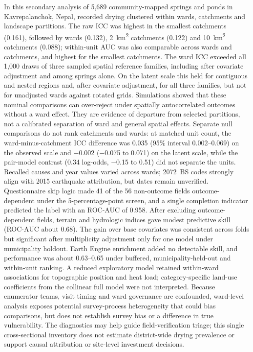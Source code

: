 \documentclass[preprint,12pt,authoryear]{elsarticle}
\begin{document}
In this secondary analysis of 5,689 community-mapped springs and ponds in Kavrepalanchok, Nepal, recorded drying clustered within wards, catchments and landscape partitions. The raw ICC was highest in the smallest catchments (0.161), followed by wards (0.132), \SI{2}{\kilo\metre\squared} catchments (0.122) and \SI{10}{\kilo\metre\squared} catchments (0.088); within-unit AUC was also comparable across wards and catchments, and highest for the smallest catchments. The ward ICC exceeded all 1,000 draws of three sampled spatial reference families, including after covariate adjustment and among springs alone. On the latent scale this held for contiguous and nested regions and, after covariate adjustment, for all three families, but not for unadjusted wards against rotated grids. Simulations showed that these nominal comparisons can over-reject under spatially autocorrelated outcomes without a ward effect. They are evidence of departure from selected partitions, not a calibrated separation of ward and general spatial effects. Separate null comparisons do not rank catchments and wards: at matched unit count, the ward-minus-catchment ICC difference was 0.035 (95\% interval 0.002--0.069) on the observed scale and $-$0.002 ($-$0.075 to 0.071) on the latent scale, while the pair-model contrast (0.34 log-odds, $-$0.15 to 0.51) did not separate the units. Recalled causes and year values varied across wards; 2072~BS codes strongly align with 2015 earthquake attribution, but dates remain unverified. Questionnaire skip logic made 41 of the 56 non-outcome fields outcome-dependent under the 5-percentage-point screen, and a single completion indicator predicted the label with an ROC-AUC of 0.958. After excluding outcome-dependent fields, terrain and hydrologic indices gave modest predictive skill (ROC-AUC about 0.68). The gain over base covariates was consistent across folds but significant after multiplicity adjustment only for one model under municipality holdout. Earth Engine enrichment added no detectable skill, and performance was about 0.63--0.65 under buffered, municipality-held-out and within-unit ranking. A reduced exploratory model retained within-ward associations for topographic position and heat load; category-specific land-use coefficients from the collinear full model were not interpreted. Because enumerator teams, visit timing and ward governance are confounded, ward-level analysis exposes potential survey-process heterogeneity that could bias comparisons, but does not establish survey bias or a difference in true vulnerability. The diagnostics may help guide field-verification triage; this single cross-sectional inventory does not estimate district-wide drying prevalence or support causal attribution or site-level investment decisions.
\end{document}
